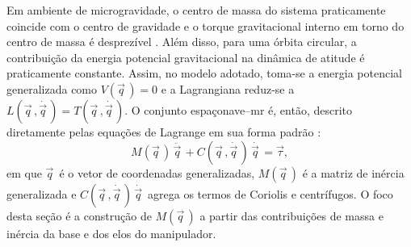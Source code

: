 
Em ambiente de microgravidade, o centro de massa do sistema praticamente
coincide com o centro de gravidade e o torque gravitacional interno em torno
do centro de massa é desprezível \cite{wie2008space}.
Além disso, para uma órbita circular, a contribuição da energia potencial
gravitacional na dinâmica de atitude é praticamente constante.
Assim, no modelo adotado, toma-se a energia potencial generalizada como
$V(\vec q\, ) = 0$ e a Lagrangiana reduz-se
a $L(\vec q\, ,\dot{\vec q\, }) = T(\vec q\, ,\dot{\vec q\, })$.
O conjunto espaçonave--\gls{mr} é, então, descrito diretamente pelas equações
de Lagrange em sua forma padrão \cite{murray1994mathematical}:
\begin{equation}
M(\vec q\, )\,\ddot{\vec q\, }
+
C(\vec q\, ,\dot{\vec q\, })\,\dot{\vec q\, }
=
\vec\tau,
\label{eq:lagrange_formato_padrao}
\end{equation}
em que $\vec q\, $ é o vetor de coordenadas generalizadas, $M(\vec q\, )$ é a
matriz de inércia generalizada e $C(\vec q\, ,\dot{\vec q\, })\,\dot{\vec q\, }$
agrega os termos de Coriolis e centrífugos.
O foco desta seção é a construção de $M(\vec q\, )$ a partir das
contribuições de massa e inércia da base e dos elos do manipulador.

